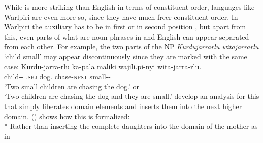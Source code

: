 \documentclass[output=paper
                ,modfonts
                ,nonflat
	        ,collection
	        ,collectionchapter
	        ,collectiontoclongg
 	        ,biblatex
                ,babelshorthands
                ,newtxmath
                ,draftmode
                ,colorlinks, citecolor=brown
]{./langsci/langscibook}
\begin{document}
While  is more striking than English in terms of constituent order, languages like
Warlpiri are even more so, since they have much freer constituent order. In
Warlpiri the auxiliary has to be in first or in second position \citep[]{DS99a}, but apart from this, even parts of what are noun
phrases in  and English can appear separated from each other. For example, the two parts of
the NP \emph{Kurdujarrarlu witajarrarlu} `child small' may appear discontinuously since they are marked with
the same case:
\ea
\label{ex-warlpiri}
\gll Kurdu-jarra-rlu  ka-pala                 maliki     wajili.pi-nyi        wita-jarra-rlu.\\
     child-\DU-\ERG{} \DU.\textsc{sbj} dog.\ABS{} chase-\textsc{npst} small-\DU-\ERG\\%
\glt `Two small children are chasing the dog.' or\\
     `Two children are chasing the dog and they are small.'
\z
%
\citet{DS99a} develop an analysis for this that simply liberates domain elements and inserts them
into the next higher domain. () shows how this is formalized:
\ea
{} \impl\\*
\z
Rather than inserting the complete daughters into the domain of the mother as in
\end{document}
